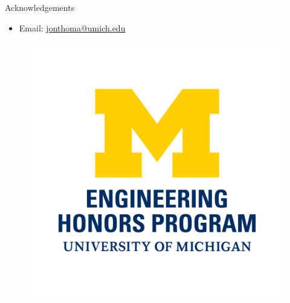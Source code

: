 \documentclass[final]{beamer}
\newlength{\halfcolwid}
\newlength{\onecolwid}
\begin{document}
\begin{frame}[t]
\begin{columns}[t]
\begin{column}{\onecolwid}
\begin{alertblock}{Acknowledgements}
\begin{itemize}
\item Email: \href{mailto:jonthoma@umich.edu}{jonthoma@umich.edu}
\end{itemize}
\end{alertblock}

\vspace{-2.5cm}
\begin{center}
\begin{figure}
\includegraphics[width=0.45\linewidth]{CoE-Honors-vert.png}
\end{figure}
\end{center}




\end{column} %

\end{columns} %

\end{frame} %
\end{document}
